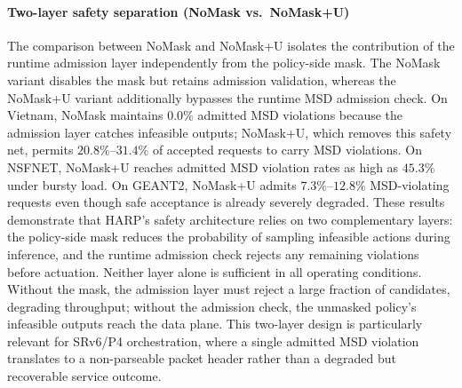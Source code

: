 \documentclass[final,5p]{elsarticle}
\begin{document}
\paragraph{Two-layer safety separation (NoMask vs.\ NoMask+U)}
The comparison between NoMask and NoMask+U isolates the contribution of the runtime admission layer independently from the policy-side mask. The NoMask variant disables the mask but retains admission validation, whereas the NoMask+U variant additionally bypasses the runtime MSD admission check. On Vietnam, NoMask maintains \(0.0\%\) admitted MSD violations because the admission layer catches infeasible outputs; NoMask+U, which removes this safety net, permits \(20.8\%\)--\(31.4\%\) of accepted requests to carry MSD violations. On NSFNET, NoMask+U reaches admitted MSD violation rates as high as \(45.3\%\) under bursty load. On GEANT2, NoMask+U admits \(7.3\%\)--\(12.8\%\) MSD-violating requests even though safe acceptance is already severely degraded. These results demonstrate that HARP's safety architecture relies on two complementary layers: the policy-side mask reduces the probability of sampling infeasible actions during inference, and the runtime admission check rejects any remaining violations before actuation. Neither layer alone is sufficient in all operating conditions. Without the mask, the admission layer must reject a large fraction of candidates, degrading throughput; without the admission check, the unmasked policy's infeasible outputs reach the data plane. This two-layer design is particularly relevant for SRv6/P4 orchestration, where a single admitted MSD violation translates to a non-parseable packet header rather than a degraded but recoverable service outcome.
\end{document}
